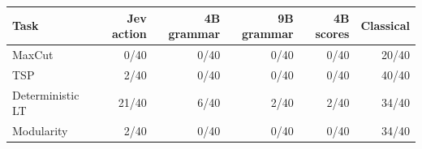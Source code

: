 \begin{tabular}{lrrrrr}
\toprule
Task & Jev action & 4B grammar & 9B grammar & 4B scores & Classical \\
\midrule
MaxCut & 0/40 & 0/40 & 0/40 & 0/40 & 20/40 \\
TSP & 2/40 & 0/40 & 0/40 & 0/40 & 40/40 \\
Deterministic LT & 21/40 & 6/40 & 2/40 & 2/40 & 34/40 \\
Modularity & 2/40 & 0/40 & 0/40 & 0/40 & 34/40 \\
\bottomrule
\end{tabular}
